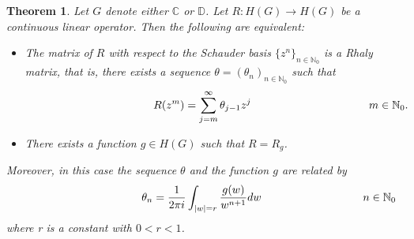 \documentclass{birkjour}
\newtheorem{thm}{Theorem}[section]
\theoremstyle{definition}
\theoremstyle{remark}
\numberwithin{equation}{section}
\begin{document}
\begin{thm}\label{TII}
Let $G$ denote either $\mathbb{C}$ or $\mathbb{D}$. Let $R: H(G)\to H(G)$ be a continuous linear operator. 
Then the following are equivalent:
\begin{itemize}
\item[(i)] The matrix of $R$ with respect to the Schauder basis 
$\{z^{n}\}_{n\in\mathbb{N}_{0}}$ is a Rhaly matrix, that is, there exists 
a sequence $\theta=(\theta_{n})_{n\in\mathbb{N}_{0}}$ such that
$$\hspace{1.6in}R(z^{m})=\sum^{\infty}_{j=m}\theta_{j-1}z^{j} \qquad \hspace{1.2in}m\in \mathbb{N}_{0}.$$
\item[(ii)] There exists a function $g\in H(G)$ such that $R=R_{g}$.
\end{itemize}
Moreover, in this case the sequence $\theta$ and the function $g$ are 
related by
$$\hspace{1.6in}\theta_{n}=\frac{1}{2\pi i} \int_{|w|=r} \frac{g(w)}{w^{n+1}}dw 
\qquad\hspace{1in} n\in \mathbb{N}_{0}$$
where r is a constant with $0<r<1$.
\end{thm}
\end{document}
